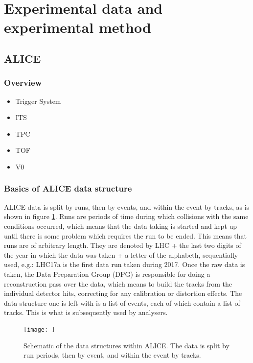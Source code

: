 \section{Experimental data and experimental method}

\subsection{ALICE}
\subsubsection{Overview}
\begin{itemize}
    \item Trigger System
    \item ITS
    \item TPC %
    \item TOF
	\item V0
\end{itemize}

\subsubsection{Basics of ALICE data structure}
ALICE data is split by runs, then by events, and within the event by tracks, as is shown in figure \ref{fig:ALICE_data_schematic}. Runs are periods of time during which collisions with the same conditions occurred, which means that the data taking is started and kept up until there is some problem which requires the run to be ended. This means that runs are of arbitrary length. They are denoted by LHC + the last two digits of the year in which the data was taken + a letter of the alphabeth, sequentially used, e.g.: LHC17a is the first data run taken during 2017. Once the raw data is taken, the Data Preparation Group (DPG) is responsible for doing a reconstruction pass over the data, which means to build the tracks from the individual detector hits, correcting for any calibration or distortion effects. The data structure  one is left with is a list of events, each of which contain a list of tracks. This is what is subsequently used by analysers. 

\begin{figure}
	\texttt{[image: ]}
	\centering
	\caption{Schematic of the data structures within ALICE. The data is split by run periods, then by event, and within the event by tracks. }
		\label{fig:ALICE_data_schematic}
\end{figure}
